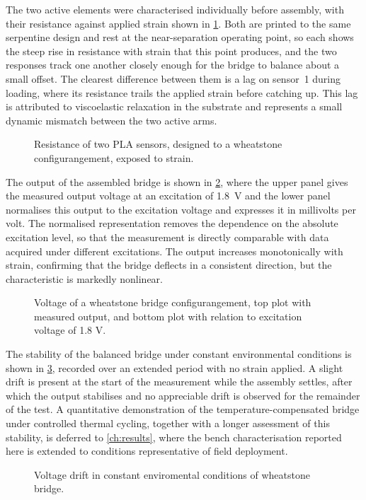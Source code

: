The two active elements were characterised individually before assembly, with their resistance against applied strain shown in \cref{fig:Wheatstone_sensorer}. Both are printed to the same serpentine design and rest at the near-separation operating point, so each shows the steep rise in resistance with strain that this point produces, and the two responses track one another closely enough for the bridge to balance about a small offset. The clearest difference between them is a lag on sensor~1 during loading, where its resistance trails the applied strain before catching up. This lag is attributed to viscoelastic relaxation in the substrate and represents a small dynamic mismatch between the two active arms.

\begin{figure}[H]
\centering

    \caption{Resistance of two PLA sensors, designed to a wheatstone configurangement, exposed to strain.}
    \label{fig:Wheatstone_sensorer}
\end{figure}

The output of the assembled bridge is shown in \cref{fig:Wheatstone1}, where the upper panel gives the measured output voltage at an excitation of \SI{1.8}{\volt} and the lower panel normalises this output to the excitation voltage and expresses it in millivolts per volt. The normalised representation removes the dependence on the absolute excitation level, so that the measurement is directly comparable with data acquired under different excitations. The output increases monotonically with strain, confirming that the bridge deflects in a consistent direction, but the characteristic is markedly nonlinear. 

\begin{figure}[H]
\centering

    \caption{Voltage of a wheatstone bridge configurangement, top plot with measured output, and bottom plot with relation to excitation voltage of 1.8 V.}
    \label{fig:Wheatstone1}
\end{figure}

The stability of the balanced bridge under constant environmental conditions is shown in \cref{fig:Wheatstone_drift}, recorded over an extended period with no strain applied. A slight drift is present at the start of the measurement while the assembly settles, after which the output stabilises and no appreciable drift is observed for the remainder of the test. A quantitative demonstration of the temperature-compensated bridge under controlled thermal cycling, together with a longer assessment of this stability, is deferred to \cref{ch:results}, where the bench characterisation reported here is extended to conditions representative of field deployment.

\begin{figure}[H]
\centering

    \caption{Voltage drift in constant enviromental conditions of wheatstone bridge.}
    \label{fig:Wheatstone_drift}
\end{figure}